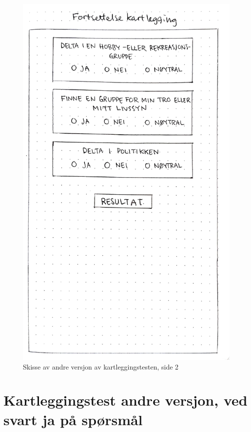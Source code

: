 \begin{figure}[H]
\centering
\includegraphics[width=.7\textwidth]{Illustrasjoner/Skisser-pdf/1.0/1-10-kartlegging-spm-del2.pdf}
\caption{Skisse av andre versjon av kartleggingstesten, side 2}
\label{vedlegg:1-10-kartlegging-spm-2}
\end{figure}

\section{Kartleggingstest andre versjon, ved svart ja på spørsmål}

